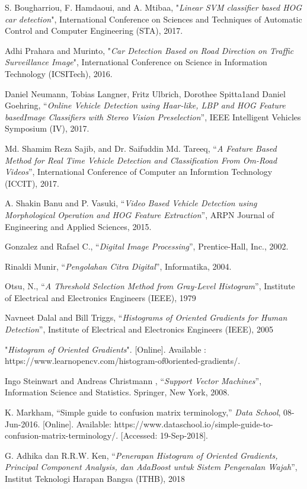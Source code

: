 
\begin{thebibliography}{7}

{S. Bougharriou, F. Hamdaoui, and A. Mtibaa, "\textit{Linear SVM classifier based HOG car detection}", International Conference on Sciences and Techniques of Automatic Control and Computer Engineering (STA), 2017. }
	
{Adhi Prahara and Murinto, "\textit{Car Detection Based on Road Direction on Traffic Surveillance Image}", International Conference on Science in Information Technology (ICSITech), 2016. }	

{Daniel Neumann, Tobias Langner, Fritz Ulbrich, Dorothee Spitta1and Daniel Goehring, “\textit{Online  Vehicle  Detection  using  Haar-like,  LBP  and  HOG  Feature  basedImage  Classifiers  with  Stereo  Vision  Preselection}”, IEEE Intelligent Vehicles Symposium (IV), 2017.}

{Md. Shamim Reza Sajib, and Dr. Saifuddin Md. Tareeq, “\textit{A Feature Based Method for Real Time Vehicle Detection and Classification From Om-Road Videos}”, International Conference of Computer an Informtion Technology (ICCIT), 2017.}
	
{A. Shakin Banu and P. Vasuki, “\textit{Video Based Vehicle Detection using Morphological Operation and HOG Feature Extraction}”, ARPN Journal of Engineering and Applied Sciences, 2015.}

{Gonzalez and Rafael C., “\textit{Digital Image Processing}”, Prentice-Hall, Inc., 2002.}

{Rinaldi Munir, “\textit{Pengolahan Citra Digital}”, Informatika, 2004.}

{Otsu, N., “\textit{A  Threshold  Selection  Method  from Gray-Level  Histogram}”, Institute of Electrical and Electronics Engineers (IEEE), 1979}

{Navneet Dalal and Bill Triggs, “\textit{Histograms of Oriented Gradients for Human Detection}”, Institute of Electrical and Electronics Engineers (IEEE), 2005}

{"\textit{Histogram of Oriented Gradients}". [Online]. Available : https://www.learnopencv.com/histogram-of0oriented-gradients/.}

{Ingo Steinwart and Andreas Christmann , “\textit{Support Vector Machines}”, Information Science and Statistics. Springer, New York, 2008.}

K. Markham, “Simple guide to confusion matrix terminology,” \textit{Data School}, 08-Jun-2016. [Online]. Available: https://www.dataschool.io/simple-guide-to-confusion-matrix-terminology/. [Accessed: 19-Sep-2018].

{G. Adhika dan R.R.W. Ken, “\textit{Penerapan Histogram of Oriented Gradients, Principal Component Analysis, dan AdaBoost untuk Sistem Pengenalan Wajah}”, Institut Teknologi Harapan Bangsa (ITHB), 2018}

\end{thebibliography}

